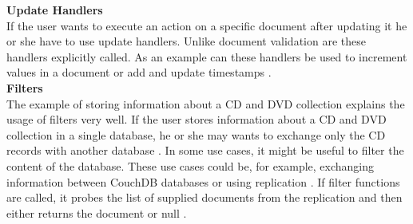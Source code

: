 \newline
\textbf{Update Handlers}\\
If the user wants to execute an action on a specific document after updating it he or she have to use update handlers. Unlike document validation are these handlers explicitly called. As an example can these handlers be used to increment values in a document or add and update timestamps \parencite{Brown.2012}. \\ 
\newline
\textbf{Filters}\\
The example of storing information about a CD and DVD collection explains the usage of filters very well.
If the user stores information about a CD and DVD collection in a single database, he or she may wants to exchange only the CD records with another database \parencite{Brown.2012}. In some use cases, it might be useful to filter the content of the database. These use cases could be, for example, exchanging information between CouchDB databases or using replication \parencite{Brown.2012}. If filter functions are called, it probes the list of supplied documents from the replication and then either returns the document or null \parencite{Brown.2012}. \\


